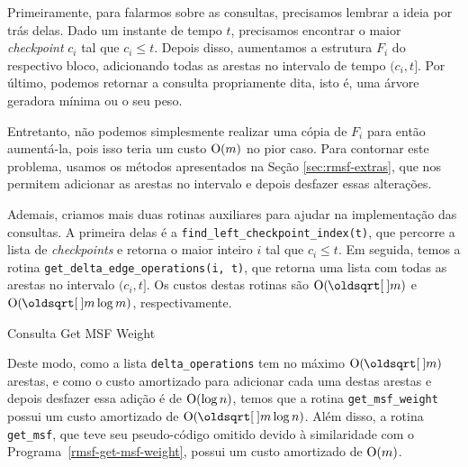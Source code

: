 Primeiramente, para falarmos sobre as consultas, precisamos lembrar a ideia por trás delas. Dado um instante de tempo $t$, precisamos encontrar o maior \emph{checkpoint} $c_i$ tal que $c_i \leq t$. Depois disso, aumentamos a estrutura $F_i$ do respectivo bloco, adicionando todas as arestas no intervalo de tempo $(c_i, t]$. Por último, podemos retornar a consulta propriamente dita, isto é, uma árvore geradora mínima ou o seu peso.

Entretanto, não podemos simplesmente realizar uma cópia de $F_i$ para então aumentá-la, pois isso teria um custo $\mathrm{O}(m)$ no pior caso. Para contornar este problema, usamos os métodos apresentados na Seção \ref{sec:rmsf-extras}, que nos permitem adicionar as arestas no intervalo e depois desfazer essas alterações.

Ademais, criamos mais duas rotinas auxiliares para ajudar na implementação das consultas. A primeira delas é a \texttt{find\_left\_checkpoint\_index(t)}, que percorre a lista de \emph{checkpoints} e retorna o maior inteiro $i$ tal que $c_i \leq t$. Em seguida, temos a rotina \texttt{get\_delta\_edge\_operations(i, t)}, que retorna uma lista com todas as arestas no intervalo $(c_i, t]$. Os custos destas rotinas são $\Oh(\sqrt{m})$ e $\Oh(\sqrt{m}\log{m})$, respectivamente.

\begin{algorithm}[h!]
    \caption{Consulta Get MSF Weight}\label{rmsf-get-msf-weight}
    \begin{algorithmic}[1]
        \State {}
        \EndFunction
    \end{algorithmic}
\end{algorithm}

Deste modo, como a lista \texttt{delta\_operations} tem no máximo $\Oh(\sqrt{m})$ arestas, e como o custo amortizado para adicionar cada uma destas arestas e depois desfazer essa adição é de $\mathrm{O}(\log{n})$, temos que a rotina \texttt{get\_msf\_weight} possui um custo amortizado de $\Oh(\sqrt{m} \log{n})$. Além disso, a rotina \texttt{get\_msf}, que teve seu pseudo-código omitido devido à similaridade com o Programa~\ref{rmsf-get-msf-weight}, possui um custo amortizado de $\mathrm{O}(m)$.

